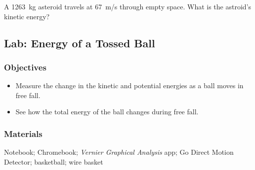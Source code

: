 \documentclass{article}
\numberwithin{equation}{section}
\numberwithin{figure}{section}
\begin{document}
\begin{exercise} \label{X7RPxf}
    A \SI{1263}{kg} asteroid travels at \SI{67}{m/s} through empty space. What is the astroid's kinetic energy?
\end{exercise}

\clearpage

\subsection{Lab: Energy of a Tossed Ball}

\subsubsection*{Objectives}

\begin{itemize}
\setlength\itemsep{-1ex}
    \item Measure the change in the kinetic and potential energies as a ball moves in free fall.
    \item See how the total energy of the ball changes during free fall.
\end{itemize}

\subsubsection*{Materials}

Notebook; Chromebook; \textit{Vernier Graphical Analysis} app; Go Direct Motion Detector; basketball; wire basket




\end{document}
